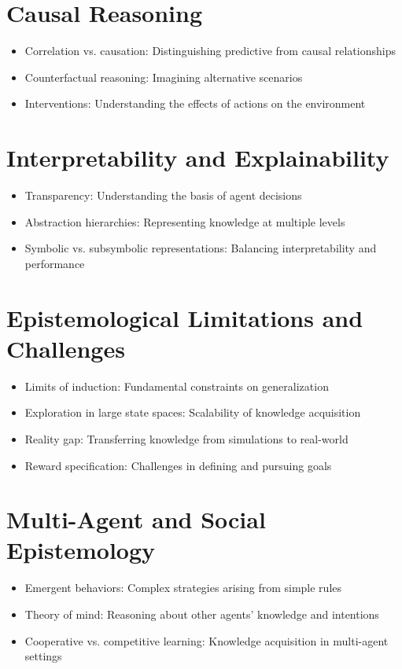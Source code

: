 \section{Causal Reasoning}
\begin{itemize}
    \item Correlation vs. causation: Distinguishing predictive from causal relationships
    \item Counterfactual reasoning: Imagining alternative scenarios
    \item Interventions: Understanding the effects of actions on the environment
\end{itemize}

\section{Interpretability and Explainability}
\begin{itemize}
    \item Transparency: Understanding the basis of agent decisions
    \item Abstraction hierarchies: Representing knowledge at multiple levels
    \item Symbolic vs. subsymbolic representations: Balancing interpretability and performance
\end{itemize}

\section{Epistemological Limitations and Challenges}
\begin{itemize}
    \item Limits of induction: Fundamental constraints on generalization
    \item Exploration in large state spaces: Scalability of knowledge acquisition
    \item Reality gap: Transferring knowledge from simulations to real-world
    \item Reward specification: Challenges in defining and pursuing goals
\end{itemize}

\section{Multi-Agent and Social Epistemology}
\begin{itemize}
    \item Emergent behaviors: Complex strategies arising from simple rules
    \item Theory of mind: Reasoning about other agents' knowledge and intentions
    \item Cooperative vs. competitive learning: Knowledge acquisition in multi-agent settings
\end{itemize}

